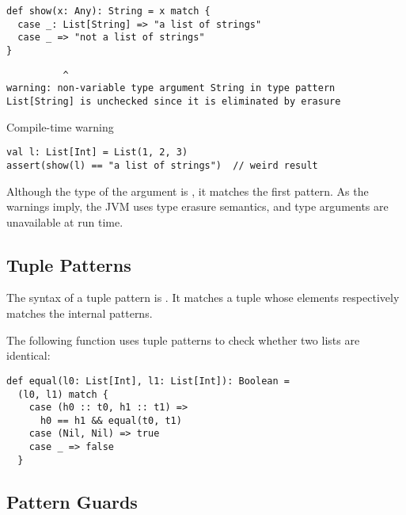 \begin{verbatim}
def show(x: Any): String = x match {
  case _: List[String] => "a list of strings"
  case _ => "not a list of strings"
}
\end{verbatim}
\vspace{-1em}
\begin{mdframed}[hidealllines=true,backgroundcolor=yellow!10,innerleftmargin=3pt,innerrightmargin=3pt,leftmargin=-3pt,rightmargin=-3pt]
\begin{verbatim}
          ^
warning: non-variable type argument String in type pattern
List[String] is unchecked since it is eliminated by erasure
\end{verbatim}
\vspace{-1.5em}
\begin{flushright}
\scriptsize\textsf{Compile-time warning}
\end{flushright}
\end{mdframed}

\begin{verbatim}
val l: List[Int] = List(1, 2, 3)
assert(show(l) == "a list of strings")  // weird result
\end{verbatim}

Although the type of the argument is , it matches the first
pattern. As the warnings imply, the JVM uses type erasure
semantics, and type arguments are unavailable at run time.

\subsection{Tuple Patterns}

The syntax of a tuple pattern is .
It matches a tuple whose elements respectively matches the internal patterns.

The following function uses tuple patterns to check
whether two lists are identical:

\begin{verbatim}
def equal(l0: List[Int], l1: List[Int]): Boolean =
  (l0, l1) match {
    case (h0 :: t0, h1 :: t1) =>
      h0 == h1 && equal(t0, t1)
    case (Nil, Nil) => true
    case _ => false
  }
\end{verbatim}

\subsection{Pattern Guards}

